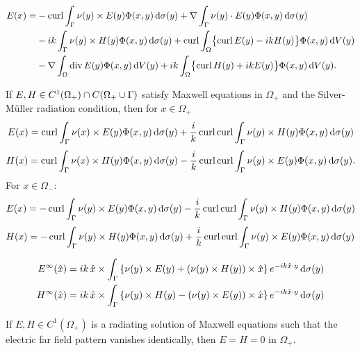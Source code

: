 \begin{prp}
  \begin{align*}
    E(x)= &-\operatorname{curl}\int_{\Gamma}\nu(y)\times E(y)\Phi(x,y)\,\text{d}\sigma(y)+\nabla\int_{\Gamma}\nu(y)\cdot E(y)\Phi(x,y)\,\text{d}\sigma(y) \\
          &-ik\int_{\Gamma}\nu(y)\times H(y)\Phi(x,y)\,\text{d}\sigma(y) +\operatorname{curl}\int_{\Omega}\bigl\{\operatorname{curl} E(y)-ikH(y)\bigr\}\Phi(x,y)\,\text{d}V(y) \\
          &-\nabla\int_{\Omega}\operatorname{div} E(y)\Phi(x,y)\,\text{d}V(y)+ik\int_{\Omega}\bigl\{\operatorname{curl} H(y)+ikE(y)\bigr\}\Phi(x,y)\,\text{d}V(y).
  \end{align*}
\end{prp}

\begin{prp}\label{prp:chu}
  If $E, H\in C^1(\Omega_+)\cap C(\Omega_+\cup\Gamma)$ satisfy Maxwell equations in $\Omega_+$ and the Silver-M\"uller radiation condition, then for $x\in\Omega_+$
  \begin{align*}
    E(x) = \operatorname{curl}\int_{\Gamma}\nu(x)\times E(y)\Phi(x,y)\,\text{d}\sigma(y)+\frac{i}{k}\operatorname{curl}\operatorname{curl}\int_{\Gamma}\nu(y)\times H(y)\Phi(x,y)\,\text{d}\sigma(y)
  \end{align*}
  \begin{align*}
    H(x) = \operatorname{curl}\int_{\Gamma}\nu(x)\times H(y)\Phi(x,y)\,\text{d}\sigma(y)-\frac{i}{k}\operatorname{curl}\operatorname{curl}\int_{\Gamma}\nu(y)\times E(y)\Phi(x,y)\,\text{d}\sigma(y).
  \end{align*}
For $x\in\Omega_-$: 
\begin{align*}
  E(x) = -\operatorname{curl}\int_{\Gamma}\nu(y)\times E(y)\Phi(x,y)\,\text{d}\sigma(y)-\frac{i}{k}\operatorname{curl}\operatorname{curl}\int_{\Gamma}\nu(y)\times H(y)\Phi(x,y)\,\text{d}\sigma(y)
\end{align*}
\begin{align*}
  H(x) = -\operatorname{curl}\int_{\Gamma}\nu(y)\times H(y)\Phi(x,y)\,\text{d}\sigma(y)+\frac{i}{k}\operatorname{curl}\operatorname{curl}\int_{\Gamma}\nu(y)\times E(y)\Phi(x,y)\,\text{d}\sigma(y)
\end{align*}
\end{prp}

\begin{prp}\label{prp:far}
  \begin{align*}
    E^\infty(\hat{x}) &= ik\,\hat{x}\times\int_{\Gamma}\left\{\nu(y)\times E(y)+(\nu(y)\times H(y))\times\hat{x}\right\}e^{-ik\hat{x}\cdot y}\,\text{d}\sigma(y) \\
    H^\infty(\hat{x}) &= ik\,\hat{x}\times\int_{\Gamma}\left\{\nu(y)\times H(y)-(\nu(y)\times E(y))\times\hat{x}\right\}e^{-ik\hat{x}\cdot y}\,\text{d}\sigma(y) 
  \end{align*}
\end{prp}

\begin{prp}
  If $E, H\in C^1(\Omega_+)$ is a radiating solution of Maxwell equations such that the electric far field pattern vanishes identically, then $E=H=0$ in $\Omega_+$.
\end{prp}

